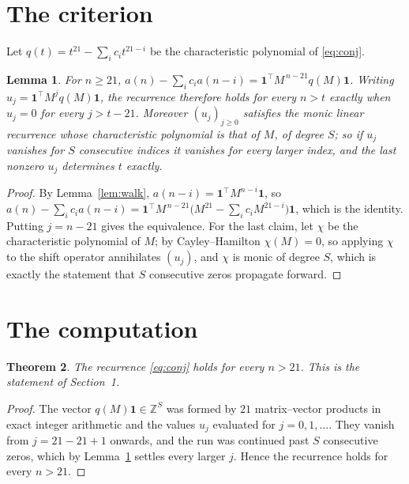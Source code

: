 \documentclass[11pt,a4paper]{article}
\theoremstyle{plain}
\newtheorem{theorem}{Theorem}
\newtheorem{lemma}[theorem]{Lemma}
\theoremstyle{definition}
\begin{document}
\section{The criterion}

Let $q(t)=t^{21}-\sum_i c_i t^{21-i}$ be the characteristic polynomial of
\eqref{eq:conj}.

\begin{lemma}\label{lem:crit}
For $n\ge21$,
$a(n)-\sum_i c_i a(n-i)=\mathbf{1}^{\!\top}M^{\,n-21}q(M)\mathbf{1}$. Writing
$u_j=\mathbf{1}^{\!\top}M^{j}q(M)\mathbf{1}$, the recurrence therefore holds for every
$n>t$ exactly when $u_j=0$ for every $j>t-21$. Moreover $(u_j)_{j\ge0}$ satisfies the
monic linear recurrence whose characteristic polynomial is that of $M$, of degree $S$; so
if $u_j$ vanishes for $S$ consecutive indices it vanishes for every larger index, and the
last nonzero $u_j$ determines $t$ exactly.
\end{lemma}

\begin{proof}
By Lemma~\ref{lem:walk}, $a(n-i)=\mathbf{1}^{\!\top}M^{n-i}\mathbf{1}$, so
$a(n)-\sum_i c_i a(n-i)
=\mathbf{1}^{\!\top}M^{\,n-21}\bigl(M^{21}-\sum_i c_i M^{21-i}\bigr)
\mathbf{1}$, which is the identity. Putting $j=n-21$ gives the equivalence. For the
last claim, let $\chi$ be the characteristic polynomial of $M$; by Cayley--Hamilton
$\chi(M)=0$, so applying $\chi$ to the shift operator annihilates $(u_j)$, and $\chi$ is
monic of degree $S$, which is exactly the statement that $S$ consecutive zeros propagate
forward.
\end{proof}

\section{The computation}

\begin{theorem}
The recurrence \eqref{eq:conj} holds for every $n>21$. This is the statement of
Section~1.
\end{theorem}

\begin{proof}
The vector $q(M)\mathbf{1}\in\mathbb{Z}^{S}$ was formed by $21$ matrix--vector
products in exact integer arithmetic and the values $u_j$ evaluated for
$j=0,1,\dots$. They vanish from $j=21-21+1$ onwards, and the run was continued past
$S$ consecutive zeros, which by Lemma~\ref{lem:crit} settles every larger $j$. Hence the
recurrence holds for every $n>21$.
\end{proof}
\end{document}
